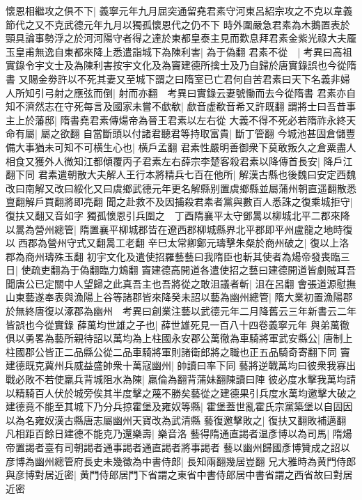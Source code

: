 懷恩相繼攻之俱不下|{
	義寧元年九月屈突通留堯君素守河東呂紹宗攻之不克以韋義節代之又不克武德元年九月以獨孤懷恩代之仍不下}
時外圍嚴急君素為木鵝置表於頸具論事勢浮之於河河陽守者得之達於東都皇泰主見而歎息拜君素金紫光祿大夫龎玉皇甫無逸自東都來降上悉遣詣城下為陳利害|{
	為于偽翻}
君素不從　|{
	考異曰高祖實錄令宇文士及為陳利害按宇文化及為竇建德所擒士及乃自歸於唐實錄誤也今從隋書}
又賜金劵許以不死其妻又至城下謂之曰隋室已亡君何自苦君素曰天下名義非婦人所知引弓射之應弦而倒|{
	射而亦翻　考異曰實錄云妻號慟而去今從隋書}
君素亦自知不濟然志在守死每言及國家未嘗不歔欷|{
	歔音虚欷音希又許既翻}
謂將士曰吾昔事主上於藩邸|{
	隋書堯君素傳煬帝為晉王君素以左右從}
大義不得不死必若隋祚永終天命有屬|{
	屬之欲翻}
自當斷頭以付諸君聽君等持取富貴|{
	斷丁管翻}
今城池甚固倉儲豐備大事猶未可知不可横生心也|{
	横戶孟翻}
君素性嚴明善御衆下莫敢叛久之倉粟盡人相食又獲外人微知江都傾覆丙子君素左右薛宗李楚客殺君素以降傳首長安|{
	降戶江翻下同}
君素遣朝散大夫解人王行本將精兵七百在他所|{
	解漢古縣也後魏曰安定西魏改曰南解又改曰綏化又曰虞鄉武德元年更名解縣别置虞鄉縣並屬蒲州朝直遥翻散悉亶翻解戶買翻將即亮翻}
聞之赴救不及因捕殺君素者黨與數百人悉誅之復乘城拒守|{
	復扶又翻又音如字}
獨孤懷恩引兵圍之　丁酉隋襄平太守鄧暠以柳城北平二郡來降以暠為營州總管|{
	隋置襄平柳城郡皆在遼西郡柳城縣界北平郡即平州盧龍之地時復以西郡為營州守式又翻暠工老翻}
辛巳太常卿鄭元璹擊朱粲於商州破之|{
	復以上洛郡為商州璹殊玉翻}
初宇文化及遣使招羅藝藝曰我隋臣也斬其使者為煬帝發喪臨三日|{
	使疏吏翻為于偽翻臨力鴆翻}
竇建德高開道各遣使招之藝曰建德開道皆劇賊耳吾聞唐公已定關中人望歸之此真吾主也吾將從之敢沮議者斬|{
	沮在呂翻}
會張道源慰撫山東藝遂奉表與漁陽上谷等諸郡皆來降癸未詔以藝為幽州總管|{
	隋大業初置漁陽郡於無終唐復以涿郡為幽州　考異曰創業注藝以武德元年二月降舊云三年新書云二年皆誤也今從實錄}
薛萬均世雄之子也|{
	薛世雄死見一百八十四卷義寧元年}
與弟萬徹俱以勇畧為藝所親待詔以萬均為上柱國永安郡公萬徹為車騎將軍武安縣公|{
	唐制上柱國郡公皆正二品縣公從二品車騎將軍則諸衛郎將之職也正五品騎奇寄翻下同}
竇建德既克冀州兵威益盛帥衆十萬寇幽州|{
	帥讀曰率下同}
藝將逆戰萬均曰彼衆我寡出戰必敗不若使羸兵背城阻水為陳|{
	羸倫為翻背蒲妹翻陳讀曰陣}
彼必度水擊我萬均請以精騎百人伏於城旁俟其半度擊之蔑不勝矣藝從之建德果引兵度水萬均邀擊大破之建德竟不能至其城下乃分兵掠霍堡及雍奴等縣|{
	霍堡蓋世亂霍氏宗黨築堡以自固因以為名雍奴漢古縣唐志屬幽州天寶改為武清縣}
藝復邀擊敗之|{
	復扶又翻敗補邁翻}
凡相距百餘日建德不能克乃還樂壽|{
	樂音洛}
藝得隋通直謁者温彥博以為司馬|{
	隋煬帝置謁者臺有司朝謁者通事謁者通直謁者將事謁者}
藝以幽州歸國彥博贊成之詔以彦博為幽州總管府長史未幾徵為中書侍郎|{
	長知兩翻幾居豈翻}
兄大雅時為黄門侍郎與彦博對居近密|{
	黄門侍郎居門下省謂之東省中書侍郎居中書省謂之西省故曰對居近密}
